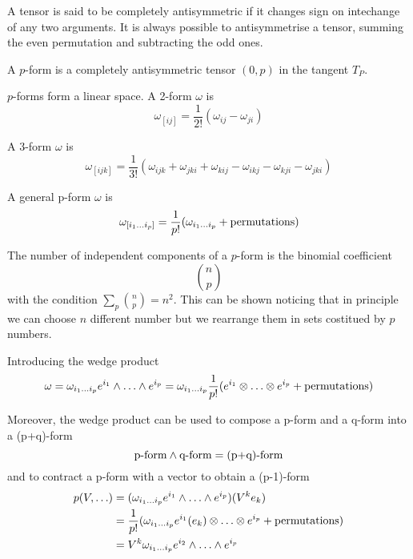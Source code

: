     A tensor is said to be completely antisymmetric if it changes sign on intechange of any two arguments. It is always possible to antisymmetrise a tensor, summing the even permutation and subtracting the odd ones.

    \begin{definition}[p-form]
        A $p$-form is a completely antisymmetric tensor $(0, p)$ in the tangent $T_P$.
    \end{definition} 
    \noindent $p$-forms form a linear space.
    A 2-form $\omega$ is 
    \begin{equation*}
        \omega_{[ij]} = \frac{1}{2!} (\omega_{ij} - \omega_{ji})
    \end{equation*}

    A 3-form $\omega$ is 
    \begin{equation*}
        \omega_{[ijk]} = \frac{1}{3!} (\omega_{ijk} + \omega_{jki} + \omega_{kij} - \omega_{ikj} - \omega_{kji} - \omega_{jki})
    \end{equation*}

    A general p-form $\omega$ is 
    \begin{equation*}
        \omega_{[i_1 \ldots i_p]} = \frac{1}{p!} (\omega_{i_1 \ldots i_p} + \textnormal{permutations})
    \end{equation*}

    The number of independent components of a $p$-form is the binomial coefficient 
    \begin{equation*}
        \binom{n}{p} 
    \end{equation*} 
    with the condition $\sum_p \binom{n}{p} = n^2$. This can be shown noticing that in principle we can choose $n$ different number but we rearrange them in sets costitued by $p$ numbers.

    Introducing the wedge product 
    \begin{equation*}
        \omega = \omega_{i_1 \ldots i_p} e^{i_1} \wedge \ldots \wedge e^{i_p} = \omega_{i_1 \ldots i_p} \frac{1}{p!} (e^{i_1} \otimes \ldots \otimes e^{i_p} + \textnormal{permutations})
    \end{equation*}

    Moreover, the wedge product can be used to compose a p-form and a q-form into a (p+q)-form
    \begin{equation*}
        \textnormal{p-form} \wedge \textnormal{q-form} = \textnormal{(p+q)-form}
    \end{equation*}
    and to contract a p-form with a vector to obtain a (p-1)-form
    \begin{equation*}
    \begin{aligned}
        p(V, \ldots) & = (\omega_{i_1 \ldots i_p} e^{i_1} \wedge \ldots \wedge e^{i_p}) (V^k e_k) \\ & = \frac{1}{p!} (\omega_{i_1 \ldots i_p} e^{i_1}(e_k) \otimes \ldots \otimes e^{i_p} + \textnormal{permutations}) \\ & = V^k\omega_{i_1 \ldots i_p} e^{i_2} \wedge \ldots \wedge e^{i_p}
    \end{aligned}
    \end{equation*}

